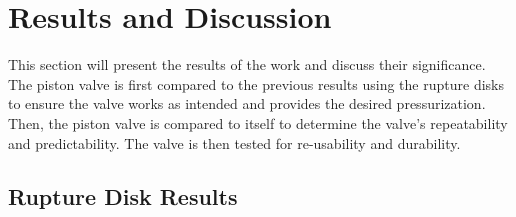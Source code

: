 \section{Results and Discussion} \label{s:results}
This section will present the results of the work and discuss their significance. The piston valve is first compared to the previous results using the rupture disks to ensure the valve works as intended and provides the desired pressurization. Then, the piston valve is compared to itself to determine the valve's repeatability and predictability. The valve is then tested for re-usability and durability.

\subsection{Rupture Disk Results}

